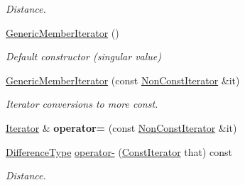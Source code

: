 \begin{DoxyCompactItemize}
\begin{DoxyCompactList}\small\item\em Distance. \end{DoxyCompactList}\item 
\hyperlink{class_generic_member_iterator_a2708717d497a0aadacdf75900de4c5b4}{Generic\+Member\+Iterator} ()
\begin{DoxyCompactList}\small\item\em Default constructor (singular value) \end{DoxyCompactList}\item 
\hyperlink{class_generic_member_iterator_a2697fd327a90654b0bf91c988e43f95e}{Generic\+Member\+Iterator} (const \hyperlink{class_generic_member_iterator_abc26eb06f2962765b11dcd06ce84ac02}{Non\+Const\+Iterator} \&it)
\begin{DoxyCompactList}\small\item\em Iterator conversions to more const. \end{DoxyCompactList}\item 
\hyperlink{class_generic_member_iterator_ad1cf1ecf6210b47906c9f179c893a8b8}{Iterator} \& {\bfseries operator=} (const \hyperlink{class_generic_member_iterator_abc26eb06f2962765b11dcd06ce84ac02}{Non\+Const\+Iterator} \&it)\hypertarget{class_generic_member_iterator_a4ebb2b80e7d70c11802520ae77958df3}{}\label{class_generic_member_iterator_a4ebb2b80e7d70c11802520ae77958df3}

\item 
\hyperlink{class_generic_member_iterator_a902b99c8ae351cd7626514dc5f30740a}{Difference\+Type} \hyperlink{class_generic_member_iterator_a056851821e75c4be13b297604bc37c0b}{operator-\/} (\hyperlink{class_generic_member_iterator_ae5be27a73dce0be58ee2776db896d591}{Const\+Iterator} that) const \hypertarget{class_generic_member_iterator_a056851821e75c4be13b297604bc37c0b}{}\label{class_generic_member_iterator_a056851821e75c4be13b297604bc37c0b}

\begin{DoxyCompactList}\small\item\em Distance. \end{DoxyCompactList}\end{DoxyCompactItemize}
